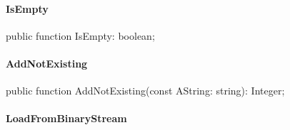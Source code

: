 \documentclass{report}
\newif\ifpdf
\begin{document}
\paragraph*{IsEmpty}\hspace*{\fill}

\label{PasDoc_StringVector.TStringVector-IsEmpty}
\begin{list}{}{
\setlength{\itemindent}{0cm}
\setlength{\listparindent}{0cm}
\setlength{\leftmargin}{\evensidemargin}
\addtolength{\leftmargin}{\tmplength}
\settowidth{\labelsep}{X}
\addtolength{\leftmargin}{\labelsep}
\setlength{\labelwidth}{\tmplength}
}
\item[\textbf{Declaration}\hfill]
\ifpdf
\begin{flushleft}
\fi
\begin{ttfamily}
public function IsEmpty: boolean;\end{ttfamily}

\ifpdf
\end{flushleft}
\fi

\end{list}
\paragraph*{AddNotExisting}\hspace*{\fill}

\label{PasDoc_StringVector.TStringVector-AddNotExisting}
\begin{list}{}{
\setlength{\itemindent}{0cm}
\setlength{\listparindent}{0cm}
\setlength{\leftmargin}{\evensidemargin}
\addtolength{\leftmargin}{\tmplength}
\settowidth{\labelsep}{X}
\addtolength{\leftmargin}{\labelsep}
\setlength{\labelwidth}{\tmplength}
}
\item[\textbf{Declaration}\hfill]
\ifpdf
\begin{flushleft}
\fi
\begin{ttfamily}
public function AddNotExisting(const AString: string): Integer;\end{ttfamily}

\ifpdf
\end{flushleft}
\fi

\end{list}
\paragraph*{LoadFromBinaryStream}\hspace*{\fill}
\end{document}
